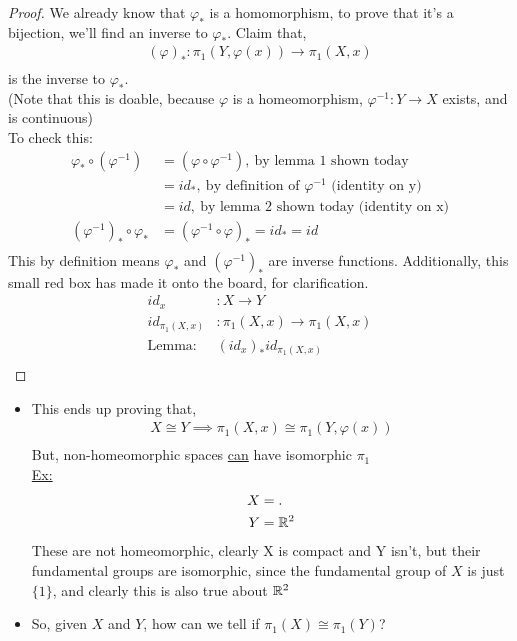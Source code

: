 \documentclass[../notes.tex]{subfiles}
\begin{document}
        \begin{proof}
            We already know that $\varphi_{*}$ is a homomorphism, to prove that it's
            a bijection, we'll find an inverse to $\varphi_{*}$. Claim that,
            \begin{align*}
                (\varphi)_{*}:\pi_1(Y,\varphi(x))\rightarrow\pi_1(X,x)\\
            \end{align*}
            is the inverse to $\varphi_{*}$.\\
            (Note that this is doable, because $\varphi$ is a homeomorphism, $\varphi^{-1}:Y\rightarrow X$ exists, and is continuous)\\
            To check this:
            \begin{align*}
                \varphi_{*}\circ (\varphi^{-1})
                &=(\varphi\circ\varphi^{-1}),\ \text{by lemma 1 shown today}\\
                &=id_{*},\ \text{by definition of $\varphi^{-1}$ (identity on y)}\\
                &=id,\ \text{by lemma 2 shown today (identity on x)}\\
                (\varphi^{-1})_{*}\circ\varphi_{*}&=(\varphi^{-1}\circ\varphi)_{*}=id_{*}=id\\
            \end{align*}
            This by definition means $\varphi_{*}$ and $(\varphi^{-1})_{*}$ are inverse functions.
            Additionally, this small red box has made it onto the board, for clarification.
            \begin{align*}
                id_x&: X \rightarrow Y\\
                id_{\pi_1(X,x)}&:\pi_1(X,x)\rightarrow\pi_1(X,x)\\
                \text{Lemma: }&(id_{x})_{*}id_{\pi_1(X,x)}\\
            \end{align*}
        \end{proof}
    \begin{itemize}
        \item
            This ends up proving that,
            \begin{align*}
                X\cong Y\implies\pi_1(X,x)\cong\pi_1(Y,\varphi(x))\\
            \end{align*}
            But, non-homeomorphic spaces \underline{can} have isomorphic $\pi_{1}$\\
            \underline{Ex:}
            \begin{align*}
                X&=.\\
                Y&=\mathbb{R}^2\\
            \end{align*}
            These are not homeomorphic, clearly X is compact and Y isn't, but their fundamental groups are
            isomorphic, since the fundamental group of $X$ is just $\{1\}$, and clearly this is also true
            about $\mathbb{R}^2$
        \item So, given $X$ and $Y$, how can we tell if $\pi_1(X)\cong\pi_1(Y)$?
    \end{itemize}
\end{document}
